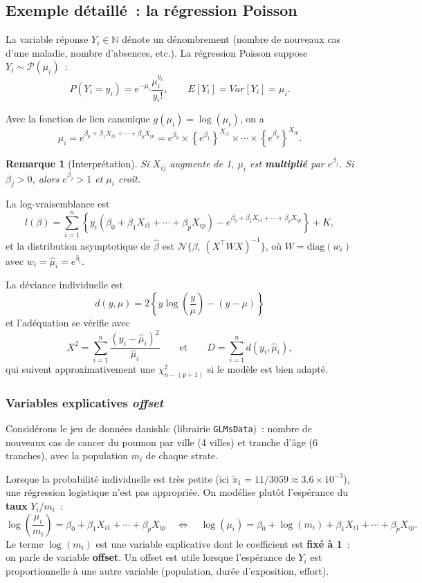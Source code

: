 \documentclass[11pt,letterpaper]{article}
\newtheorem{remarque}{Remarque}[section]
\begin{document}
\subsection{Exemple détaillé~: la régression Poisson}
\label{subsec:poisson}

La variable réponse $Y_i \in \mathbb{N}$ dénote un dénombrement (nombre de nouveaux cas d'une maladie, nombre d'absences, etc.). La régression Poisson suppose $Y_i \sim \mathcal{P}(\mu_i)$~:
$$P(Y_i = y_i) = e^{-\mu_i}\frac{\mu_i^{y_i}}{y_i!}, \qquad E[Y_i] = Var[Y_i] = \mu_i.$$

Avec la fonction de lien canonique $g(\mu_i) = \log(\mu_i)$, on a
$$\mu_i = e^{\beta_0 + \beta_1 X_{i1} + \cdots + \beta_p X_{ip}} = e^{\beta_0}\times\left\{e^{\beta_1}\right\}^{X_{i1}}\times\cdots\times\left\{e^{\beta_p}\right\}^{X_{ip}}.$$

\begin{remarque}[Interprétation]
Si $X_{ij}$ augmente de 1, $\mu_i$ est \textbf{multiplié} par $e^{\beta_j}$. Si $\beta_j > 0$, alors $e^{\beta_j} > 1$ et $\mu_i$ croît.
\end{remarque}

La log-vraisemblance est
$$l(\beta) = \sum_{i=1}^n\left\{y_i(\beta_0 + \beta_1 X_{i1} + \cdots + \beta_p X_{ip}) - e^{\beta_0 + \beta_1 X_{i1} + \cdots + \beta_p X_{ip}}\right\} + K,$$
et la distribution asymptotique de $\hat\beta$ est $\mathcal{N}\{\beta,\,(X^\top WX)^{-1}\}$, où $W = \mathrm{diag}(w_i)$ avec $w_i = \hat\mu_i = e^{\hat\eta_i}$.

La déviance individuelle est
$$d(y,\mu) = 2\left\{y\log\!\left(\frac{y}{\mu}\right) - (y - \mu)\right\}$$
et l'adéquation se vérifie avec
$$X^2 = \sum_{i=1}^n\frac{(y_i - \hat\mu_i)^2}{\hat\mu_i} \qquad\mbox{et}\qquad D = \sum_{i=1}^n d(y_i,\hat\mu_i),$$
qui suivent approximativement une $\chi^2_{n-(p+1)}$ si le modèle est bien adapté.

\subsubsection{Variables explicatives \textit{offset}}

Considérons le jeu de données \textsf{danishlc} (librairie \texttt{GLMsData})~: nombre de nouveaux cas de cancer du poumon par ville (4 villes) et tranche d'âge (6 tranches), avec la population $m_i$ de chaque strate.

Lorsque la probabilité individuelle est très petite (ici $\tilde\pi_1 = 11/3059 \approx 3.6\times10^{-3}$), une régression logistique n'est pas appropriée. On modélise plutôt l'espérance du \textbf{taux} $Y_i/m_i$~:
$$\log\!\left(\frac{\mu_i}{m_i}\right) = \beta_0 + \beta_1 X_{i1} + \cdots + \beta_p X_{ip}
\quad\Longleftrightarrow\quad
\log(\mu_i) = \beta_0 + \log(m_i) + \beta_1 X_{i1} + \cdots + \beta_p X_{ip}.$$
Le terme $\log(m_i)$ est une variable explicative dont le coefficient est \textbf{fixé à 1}~: on parle de variable \textbf{offset}. Un offset est utile lorsque l'espérance de $Y_i$ est proportionnelle à une autre variable (population, durée d'exposition, effort).
\end{document}
